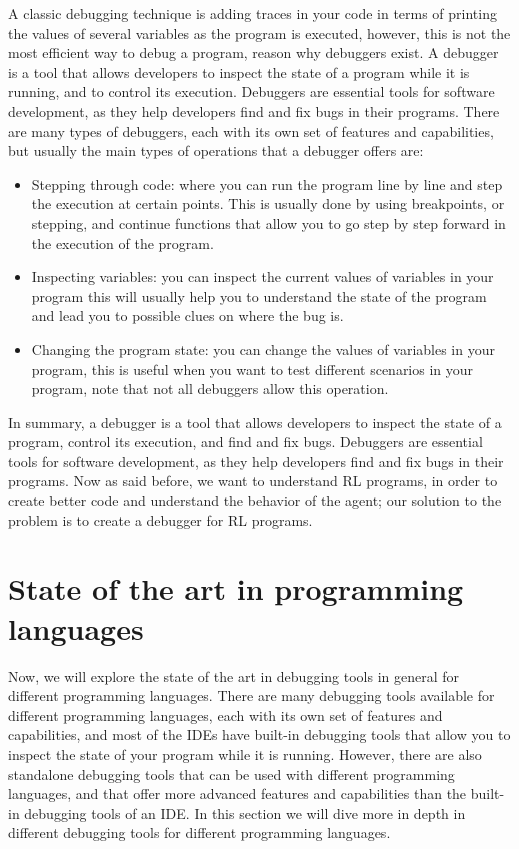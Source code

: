 A classic debugging technique is adding traces in your code in terms of printing the 
values of several variables as the program is executed, however, this is not the most 
efficient way to debug a program, reason why debuggers exist. A debugger is a tool 
that allows developers to inspect the state of a program while it is running, and to 
control its execution. Debuggers are essential tools for software development, as they 
help developers find and fix bugs in their programs. There are many types of 
debuggers, each with its own set of features and capabilities, but usually the main 
types of operations that a debugger offers\cite{10.5555/1457534} are:

\begin{itemize}
    \item Stepping through code: where you can run the program line by line and step 
    the execution at certain points. This is usually done by using breakpoints, or stepping, 
    and continue functions that allow you to go step by step forward in the execution of
    the program.
    \item Inspecting variables: you can inspect the current values of variables in your 
    program this will usually help you to understand the state of the program and lead you 
    to possible clues on where the bug is.
    \item Changing the program state: you can change the values of variables in your program, 
    this is useful when you want to test different scenarios in your program, note that not
    all debuggers allow this operation.
\end{itemize}

In summary, a debugger is a tool that allows developers to inspect the state of a program,
control its execution, and find and fix bugs. Debuggers are essential tools for software 
development, as they help developers find and fix bugs in their programs. Now as said before, 
we want to understand \ac{RL} programs, in order to create better code and understand the behavior
of the agent; our solution to the problem is to create a debugger for \ac{RL} programs.

\section{State of the art in programming languages}
\label{sec:other}
Now, we will explore the state of the art in debugging tools in general for different 
programming languages. There are many debugging tools available for different programming 
languages, each with its own set of features and capabilities, and most of the IDEs have 
built-in debugging tools that allow you to inspect the state of your program while it is 
running. However, there are also standalone debugging tools that can be used with different 
programming languages, and that offer more advanced features and capabilities than the 
built-in debugging tools of an IDE. In this section we will dive more in depth in different 
debugging tools for different programming languages.

